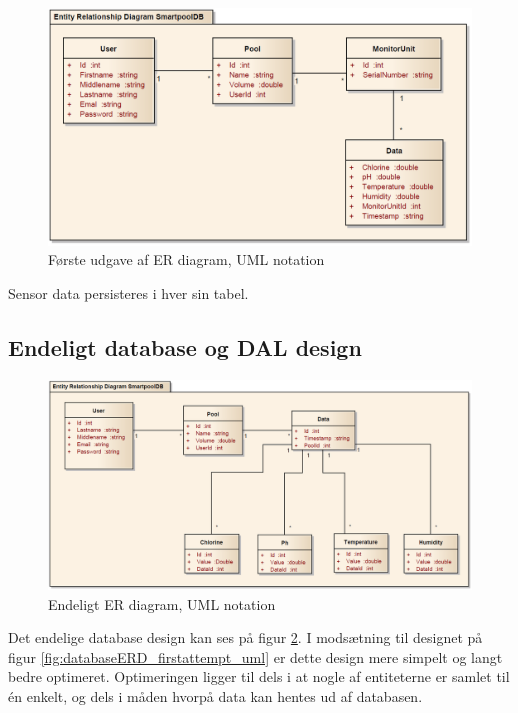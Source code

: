 \begin{figure}
	\centering
	\includegraphics[width=\linewidth]{figs/design/databaseERD_old_uml}
	\caption{Første udgave af ER diagram, UML notation}
	\label{fig:databaseERD_old_uml}
\end{figure}

Sensor data persisteres i hver sin tabel.

\subsection{Endeligt database og DAL design}

\begin{figure}
\centering
\includegraphics[width=\linewidth]{figs/design/databaseERD_final_uml}
\caption{Endeligt ER diagram, UML notation}
\label{fig:databaseERD_final_uml}
\end{figure}

Det endelige database design kan ses på figur \ref{fig:databaseERD_final_uml}. I modsætning til designet på figur \ref{fig:databaseERD_firstattempt_uml} er dette design mere simpelt og langt bedre optimeret. Optimeringen ligger til dels i at nogle af entiteterne er samlet til én enkelt, og dels i måden hvorpå data kan hentes ud af databasen. 

